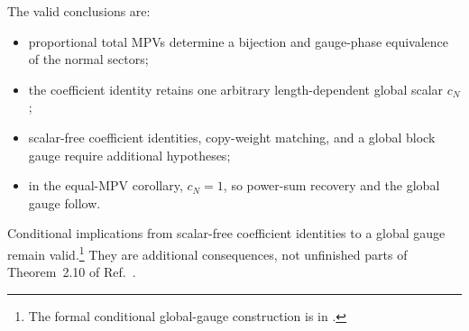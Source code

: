 \documentclass{article}
\begin{document}
The valid conclusions are:
\begin{itemize}
    \item proportional total MPVs determine a bijection and gauge-phase
          equivalence of the normal sectors;
    \item the coefficient identity retains one arbitrary length-dependent
          global scalar $c_N$;
    \item scalar-free coefficient identities, copy-weight matching, and a
          global block gauge require additional hypotheses;
    \item in the equal-MPV corollary, $c_N=1$, so power-sum recovery and the
          global gauge follow.
\end{itemize}

Conditional implications from scalar-free coefficient identities to a global
gauge remain valid.\footnote{The formal conditional global-gauge construction
is
in .}
They are additional consequences, not unfinished parts of Theorem~2.10 of
Ref.~\cite{Cirac2016MPDO_arXiv}.



\end{document}
